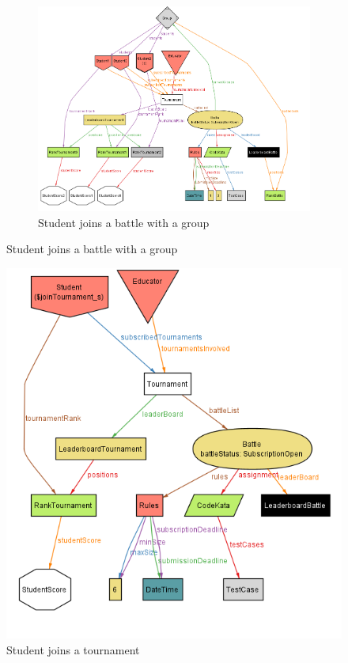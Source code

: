 \begin{figure}
    \begin{figure}[H]
        \begin{center}
            \includegraphics[width=1\linewidth]{misc//Images//AlloySims/joinNewBattle.png}
            \caption{Student joins a battle with a group}    
        \end{center}
    \end{figure}
\end{figure}


\begin{figure}
    \centering
    \includegraphics[width=1\linewidth]{misc//Images//AlloySims/joinTournament.png}
    \caption{Student joins a tournament}
    \label{fig:enter-label}
\end{figure}


